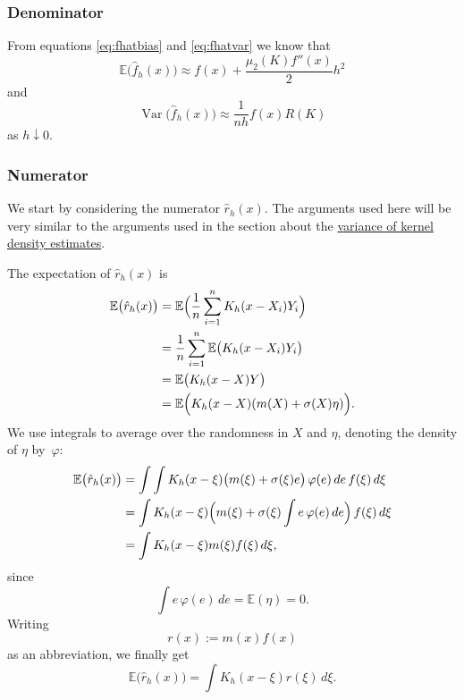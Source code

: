 \documentclass[
  a4paper,
]{article}
\theoremstyle{definition}
\theoremstyle{definition}
\theoremstyle{definition}
\theoremstyle{definition}
\theoremstyle{remark}
\begin{document}
\subsubsection*{Denominator}\label{denominator}

From equations \eqref{eq:fhatbias} and \eqref{eq:fhatvar} we know that
\begin{equation*}
  \mathbb{E}\bigl( \hat f_h(x) \bigr)
  \approx f(x) + \frac{\mu_2(K) f''(x)}{2} h^2
\end{equation*}
and
\begin{equation*}
  \mathop{\mathrm{Var}}\bigl( \hat f_h(x) \bigr)
  \approx \frac{1}{nh} f(x) R(K)
\end{equation*}
as \(h \downarrow 0\).

\subsubsection*{Numerator}\label{numerator}

We start by considering the numerator \(\hat r_h(x)\). The arguments used here
will be very similar to the arguments used in the section about the
\hyperref[X03-Var]{variance of kernel density estimates}.

The expectation of \(\hat r_h(x)\) is
\begin{align*}
  \mathbb{E}\bigl( \hat r_h(x) \bigr)
  &= \mathbb{E}\Bigl( \frac1n \sum_{i=1}^n K_h(x - X_i) Y_i \Bigr) \\
  &= \frac1n \sum_{i=1}^n \mathbb{E}\bigl( K_h(x - X_i) Y_i \bigr) \\
  &= \mathbb{E}\bigl( K_h(x - X) Y \bigr) \\
  &= \mathbb{E}\Bigl( K_h(x - X) (m(X) + \sigma(X)\eta) \Bigr).
\end{align*}
We use integrals to average over the randomness in \(X\) and \(\eta\),
denoting the density of \(\eta\) by~\(\varphi\):
\begin{align*}
  \mathbb{E}\bigl( \hat r_h(x) \bigr)
  &= \int \int K_h(x - \xi) \bigl( m(\xi) + \sigma(\xi) e \bigr) \, \varphi(e) \, de \, f(\xi) \, d\xi \\
  &= \int K_h(x - \xi) \Bigl( m(\xi) +\sigma(\xi) \int e \, \varphi(e) \, de \Bigr) \, f(\xi) \, d\xi \\
  &= \int K_h(x - \xi) m(\xi) f(\xi) \, d\xi,
\end{align*}
since
\begin{equation*}
  \int e \, \varphi(e) \, de
  = \mathbb{E}(\eta)
  = 0.
\end{equation*}
Writing
\begin{equation*}
  r(x)
  := m(x) f(x)
\end{equation*}
as an abbreviation, we finally get
\begin{equation*}
  \mathbb{E}\bigl( \hat r_h(x) \bigr)
  = \int K_h(x - \xi) r(\xi) \, d\xi.
\end{equation*}
\end{document}
